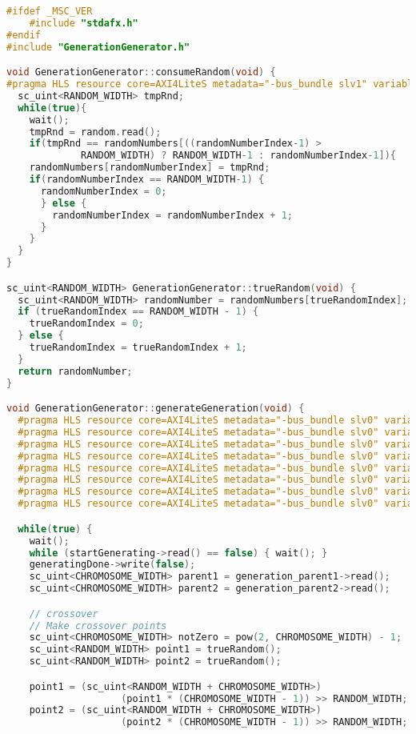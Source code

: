 \begin{lstlisting}[language=C++,caption={GenerationGenerator.cpp},label={lst:generationgenerator_cpp}]
#ifdef _MSC_VER
	#include "stdafx.h"
#endif
#include "GenerationGenerator.h"

void GenerationGenerator::consumeRandom(void) {
#pragma HLS resource core=AXI4LiteS metadata="-bus_bundle slv1" variable=random
  sc_uint<RANDOM_WIDTH> tmpRnd;
  while(true){
    wait();
    tmpRnd = random.read();
    if(tmpRnd == randomNumbers[((randomNumberIndex-1) > 
             RANDOM_WIDTH) ? RANDOM_WIDTH-1 : randomNumberIndex-1]){
    randomNumbers[randomNumberIndex] = tmpRnd;
    if(randomNumberIndex == RANDOM_WIDTH-1) {
      randomNumberIndex = 0;
      } else {
        randomNumberIndex = randomNumberIndex + 1;
      }
    }
  }
}

sc_uint<RANDOM_WIDTH> GenerationGenerator::trueRandom(void) {
  sc_uint<RANDOM_WIDTH> randomNumber = randomNumbers[trueRandomIndex];
  if (trueRandomIndex == RANDOM_WIDTH - 1) {
    trueRandomIndex = 0;
  } else {
    trueRandomIndex = trueRandomIndex + 1;
  }
  return randomNumber;
}

void GenerationGenerator::generateGeneration(void) {
  #pragma HLS resource core=AXI4LiteS metadata="-bus_bundle slv0" variable=generation_parent1
  #pragma HLS resource core=AXI4LiteS metadata="-bus_bundle slv0" variable=generation_parent2
  #pragma HLS resource core=AXI4LiteS metadata="-bus_bundle slv0" variable=generation_child1
  #pragma HLS resource core=AXI4LiteS metadata="-bus_bundle slv0" variable=generation_child2
  #pragma HLS resource core=AXI4LiteS metadata="-bus_bundle slv0" variable=generation_parent1
  #pragma HLS resource core=AXI4LiteS metadata="-bus_bundle slv0" variable=mutation_probability
  #pragma HLS resource core=AXI4LiteS metadata="-bus_bundle slv0" variable=startGenerating
  #pragma HLS resource core=AXI4LiteS metadata="-bus_bundle slv0" variable=generatingDone

  while(true) {
    wait();	
    while (startGenerating->read() == false) { wait(); }
    generatingDone->write(false);
    sc_uint<CHROMOSOME_WIDTH> parent1 = generation_parent1->read();
    sc_uint<CHROMOSOME_WIDTH> parent2 = generation_parent2->read();

    // crossover
    // Make crossover points
    sc_uint<CHROMOSOME_WIDTH> notZero = pow(2, CHROMOSOME_WIDTH) - 1;
    sc_uint<RANDOM_WIDTH> point1 = trueRandom();
    sc_uint<RANDOM_WIDTH> point2 = trueRandom();

    point1 = (sc_uint<RANDOM_WIDTH + CHROMOSOME_WIDTH>) 
                    (point1 * (CHROMOSOME_WIDTH - 1)) >> RANDOM_WIDTH;
    point2 = (sc_uint<RANDOM_WIDTH + CHROMOSOME_WIDTH>) 
                    (point2 * (CHROMOSOME_WIDTH - 1)) >> RANDOM_WIDTH;


\end{lstlisting}
